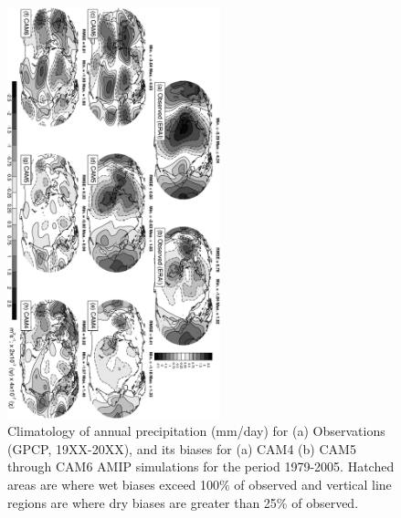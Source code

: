 \clearpage
\begin{figure}[t]
  \begin{center}
    \includegraphics[width=0.55\textwidth,angle=90.]{./figs/f_PSICHI_2D_ANN_CAM456.pdf}
  \end{center}
  \caption{Climatology of annual precipitation (mm/day) for (a) Observations (GPCP, 19XX-20XX), and its biases for (a) CAM4 (b) CAM5  through CAM6 AMIP simulations for the period 1979-2005. Hatched areas are where wet biases exceed 100\% of observed and vertical line regions are where dry biases are greater than 25\% of observed.}
\label{f_PSICHI_2D_CAM456}
\end{figure}

